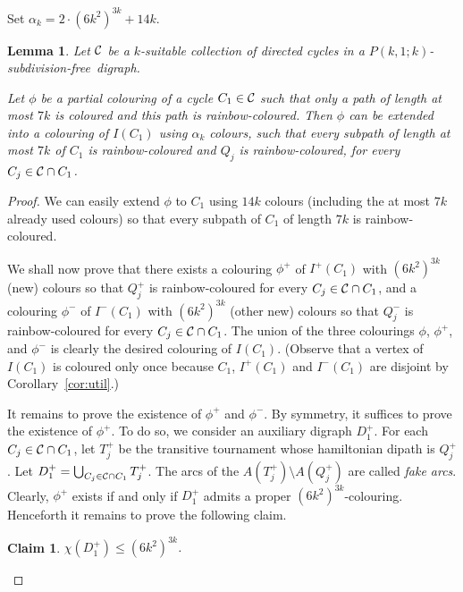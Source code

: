 \documentclass[utf8,10pt]{article}
\theoremstyle{plain}
\newtheorem{lemma}[theorem]{Lemma}
\newtheorem{claim}{Claim}[theorem]
\theoremstyle{definition}
\theoremstyle{remark}
\newcommand{\col}{(6k^2)^{3k}}
\newcommand{\free}{subdivision-free}
\begin{document}
Set $\alpha_k=2\cdot \col + 14k$.

\begin{lemma}\label{lem:IC}
Let ${\cal C}$ be a $k$-suitable collection of directed cycles in a $P(k,1;k)$-\free\ digraph.

Let $\phi$ be a partial colouring of a cycle $C_1\in {\cal C}$ such that only a path of length at most
$7k$ is coloured and this path is rainbow-coloured. Then $\phi$ can be extended into
a colouring of $I(C_1)$ using $\alpha_k$ colours, such that every subpath of length at most $7k$ of $C_1$ is rainbow-coloured and  $Q_j$ is rainbow-coloured, for every $C_j\in {\cal C}\cap C_1$.\end{lemma}

\begin{proof}
We can easily extend $\phi$ to $C_1$ using $14k$ colours (including the at most $7k$ already used colours)
so that every subpath of $C_1$ of length $7k$ is rainbow-coloured.

We shall now prove that there exists a colouring $\phi^+$ of $I^+(C_1)$ with $\col$ (new) colours so that $Q^+_j$ is rainbow-coloured for every $C_j\in {\cal C}\cap C_1$, and a colouring $\phi^-$ of $I^-(C_1)$ with $\col$ (other new) colours so that $Q^-_j$ is rainbow-coloured for every $C_j\in {\cal C}\cap C_1$.
The union of the three colourings $\phi$, $\phi^+$, and $\phi^-$ is clearly the desired colouring of $I(C_1)$. (Observe that a vertex of $I(C_1)$ is coloured only once because  $C_1$, $I^+(C_1)$ and $I^-(C_1)$ are disjoint by Corollary~\ref{cor:util}.)

\smallskip

It remains to prove the existence of $\phi^+$ and $\phi^-$. By symmetry, it suffices to prove the existence of $\phi^+$.
 To do so, we consider an auxiliary digraph $D^+_1$.
 For each $C_j\in {\cal C}\cap C_1$, let $T^+_j$ be the transitive tournament whose hamiltonian dipath is $Q^+_j$.
Let $D^+_1=\bigcup_{C_j\in  {\cal C}\cap C_1} T^+_j$. 
The arcs of the $A(T^+_j)\setminus A(Q^+_j)$ are called {\it fake arcs}.
Clearly, $\phi^+$ exists if and only if $D^+_1$ admits a proper $\col$-colouring. Henceforth it remains to prove the following claim.

\begin{claim}\label{claim:c+}
$\chi(D^+_1) \leq  \col$.
\end{claim}


\end{proof}
\end{document}
